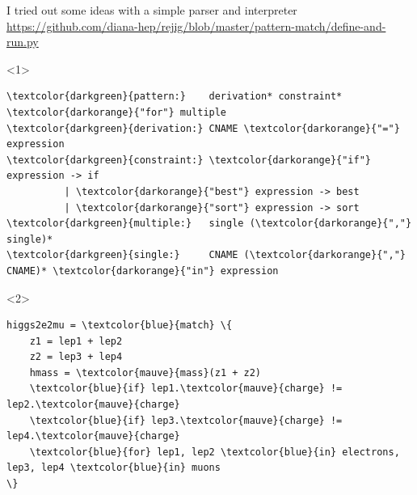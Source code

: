\documentclass[aspectratio=169]{beamer}
\begin{document}
\begin{frame}[fragile]{I tried out some ideas with a simple parser and interpreter}
\Large
\vspace{0.5 cm}
\textcolor{blue}{\small \url{https://github.com/diana-hep/rejig/blob/master/pattern-match/define-and-run.py}}

\vspace{0.5 cm}

\begin{center}
\begin{minipage}{0.85\linewidth}
\normalsize
\begin{onlyenv}<1>
\begin{Verbatim}[commandchars=\\\{\}]
\textcolor{darkgreen}{pattern:}    derivation* constraint* \textcolor{darkorange}{"for"} multiple
\textcolor{darkgreen}{derivation:} CNAME \textcolor{darkorange}{"="} expression
\textcolor{darkgreen}{constraint:} \textcolor{darkorange}{"if"} expression -> if
          | \textcolor{darkorange}{"best"} expression -> best
          | \textcolor{darkorange}{"sort"} expression -> sort
\textcolor{darkgreen}{multiple:}   single (\textcolor{darkorange}{","} single)*
\textcolor{darkgreen}{single:}     CNAME (\textcolor{darkorange}{","} CNAME)* \textcolor{darkorange}{"in"} expression
\end{Verbatim}
\vspace{\baselineskip}
\end{onlyenv}
\begin{onlyenv}<2>
\vspace{-0.5\baselineskip}
\begin{Verbatim}[commandchars=\\\{\}]
higgs2e2mu = \textcolor{blue}{match} \{
    z1 = lep1 + lep2
    z2 = lep3 + lep4
    hmass = \textcolor{mauve}{mass}(z1 + z2)
    \textcolor{blue}{if} lep1.\textcolor{mauve}{charge} != lep2.\textcolor{mauve}{charge}
    \textcolor{blue}{if} lep3.\textcolor{mauve}{charge} != lep4.\textcolor{mauve}{charge}
    \textcolor{blue}{for} lep1, lep2 \textcolor{blue}{in} electrons, lep3, lep4 \textcolor{blue}{in} muons
\}
\end{Verbatim}
\end{onlyenv}
\end{minipage}
\end{center}

\normalsize {}
\end{frame}
\end{document}
